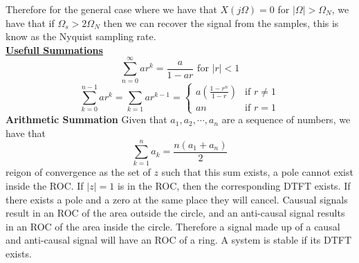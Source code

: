 \documentclass[9pt]{article}
\begin{document}
Therefore for the general case where we have that 
$X(j\Omega)=0$ for $|\Omega|>\Omega_N$, we have that
if $\Omega_s>2\Omega_N$ then we 
can recover the signal from the samples, this is know as the Nyquist sampling rate. \\
\underline{\textbf{Usefull Summations}}\\
$$\sum_{n=0}^{\infty}ar^k=\frac{a}{1-ar} \text{ for }|r|<1$$
$$\sum_{k=0}^{n-1}ar^{k}=\sum_{k=1}ar^{k-1}=\begin{cases}
    a\left(\frac{1-r^n}{1-r}\right) & \text{if }r\neq 1\\
    an & \text{if }r=1
\end{cases}$$
\textbf{Arithmetic Summation}
Given that $a_1,a_2,\cdots,a_n$ are a sequence of numbers, we have that
$$\sum_{k=1}^n a_k=\frac{n(a_1+a_n)}{2}$$
reigon of convergence as the set of $z$ such that this sum exists, a pole 
cannot exist inside the ROC. If $|z|=1$
is in the ROC, then the corresponding DTFT exists. If there exists 
a pole and a zero at the same place they will cancel. Causual signals
result in an ROC of the area outside the circle, and an anti-causal signal
results in an ROC of the area inside the circle. Therefore a signal 
made up of a causal and anti-causal signal will have an ROC of a ring. A system
is stable if its DTFT exists.
\end{document}
